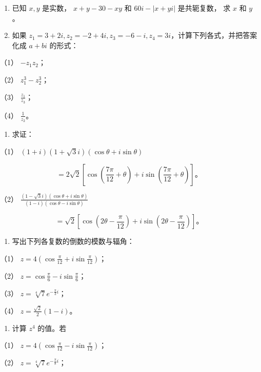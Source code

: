 \begin{enumerate}
\item
  已知 \(x, y\) 是实数， \(x + y - 30 - xy\) 和 \(60i - |x + yi|\)
  是共轭复数， 求 \(x\) 和 \(y\)。
\item
  如果
  \(z_{1} = 3 + 2i, z_{2} = -2 + 4i, z_{3} = -6 - i, z_{4} = 3i\)，计算下列各式，并把答案化成
  \(a + bi\) 的形式：
\end{enumerate}

（1） \(-z_{1}z_{2}\)；

（2） \(z_{1}^{3} - z_{2}^{3}\)；

（3） \(\frac{z_1}{z_3}\)；

（4） \(\frac{1}{z_2}\)。

\begin{enumerate}[start=3]
\item
  求证：
\end{enumerate}

（1） \((1 + i)(1 + \sqrt{3}i)(\cos \theta + i\sin \theta)\)

\[
= 2 \sqrt {2} \left[ \cos \left(\frac {7 \pi}{12} + \theta\right) + i \sin \left(\frac {7 \pi}{12} + \theta\right) \right]\text{。}
\]

（2）
\(\frac{(1 - \sqrt{3}i)(\cos\theta + i\sin\theta)}{(1 - i)(\cos\theta - i\sin\theta)}\)

\[
= \sqrt {2} \left[ \cos \left(2 \theta - \frac {\pi}{12}\right) + i \sin \left(2 \theta - \frac {\pi}{12}\right) \right]\text{。}
\]

\begin{enumerate}[start=4]
\item
  写出下列各复数的倒数的模数与辐角：
\end{enumerate}

（1） \(z = 4\left(\cos \frac{\pi}{12} + i\sin \frac{\pi}{12}\right)\)；

（2） \(z = \cos \frac{\pi}{6} - i \sin \frac{\pi}{6}\)；

（3） \(z = \sqrt[4]{7} e^{-\frac{\pi}{3} i}\)；

（4） \(z = \frac{\sqrt{2}}{2} (1 - i)\)。

\begin{enumerate}[start=5]
\item
  计算 \(z^4\) 的值。若
\end{enumerate}

（1） \(z = 4\left(\cos \frac{\pi}{12} - i\sin \frac{\pi}{12}\right)\)；

（2） \(z = \sqrt[4]{7} e^{-\frac{\pi}{8} i}\)；

